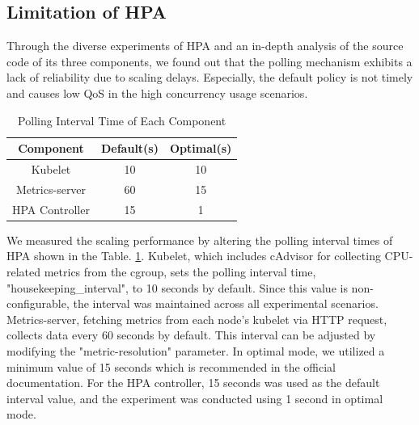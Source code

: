 \documentclass[conference]{IEEEtran}
\begin{document}
\subsection{Limitation of HPA}

Through the diverse experiments of HPA and an in-depth analysis of the source code of its three components, we found out that the polling mechanism exhibits a lack of reliability due to scaling delays. Especially, the default policy is not timely and causes low QoS in the high concurrency usage scenarios\cite{huo2023high}.


\begin{table}[ht!]
    \caption{Polling Interval Time of Each Component}
    \begin{center}
        \begin{tabular}{|c|c|c|}
            \hline
            \cline{2-3}
            \textbf{Component} & \textbf{{Default(s)}} & {\textbf{Optimal(s)}} \\
            \hline
            Kubelet            & 10                    & 10                    \\
            \hline
            Metrics-server     & 60                    & 15                    \\
            \hline
            HPA Controller     & 15                    & 1                     \\
            \hline
        \end{tabular}
        \label{tab:Polling Interval Time of Each Component}
    \end{center}
\end{table}


We measured the scaling performance by altering the polling interval times of HPA shown in the Table. \ref{tab:Polling Interval Time of Each Component}. Kubelet, which includes cAdvisor for collecting CPU-related metrics from the cgroup, sets the polling interval time, "housekeeping\_interval", to 10 seconds by default. Since this value is non-configurable, the interval was maintained across all experimental scenarios. Metrics-server, fetching metrics from each node's kubelet via HTTP request, collects data every 60 seconds by default. This interval can be adjusted by modifying the "metric-resolution" parameter. In optimal mode, we utilized a minimum value of 15 seconds which is recommended in the official documentation\cite{metrics-server-FAQ}. For the HPA controller, 15 seconds was used as the default interval value, and the experiment was conducted using 1 second in optimal mode.
\end{document}
